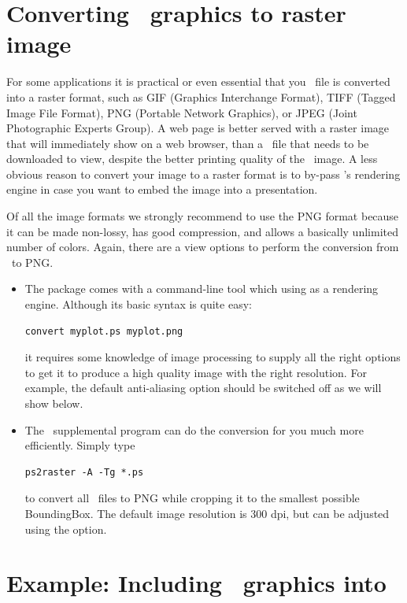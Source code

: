 \section{Converting \gmt\ graphics to raster image}

For some applications it is practical or even essential that you \PS\ file is converted into a raster format, such as GIF (Graphics Interchange Format), TIFF (Tagged Image File Format), PNG (Portable Network Graphics), or JPEG (Joint Photographic Experts Group). A web page is better served with a raster image that will immediately show on a web browser, than a \PS\ file that needs to be downloaded to view, despite the better printing quality of the \PS\ image. A less obvious reason to convert your image to a raster format is to by-pass 's rendering engine in case you want to embed the image into a presentation.

Of all the image formats we strongly recommend to use the PNG format because it can be made non-lossy, has good compression, and allows a basically unlimited number of colors. Again, there are a view options to perform the conversion from \PS\ to PNG.
\begin{itemize}
\item The  package comes with a command-line tool  which using  as a rendering engine. Although its basic syntax is quite easy:
\small
\begin{verbatim}
convert myplot.ps myplot.png
\end{verbatim}
\normalsize
it requires some knowledge of image processing to supply all the right options to get it to produce a high quality image with the right resolution. For example, the default anti-aliasing option should be switched off as we will show below. 

\item The \GMT\ supplemental program  can do the conversion for you much more efficiently. Simply type
\small
\begin{verbatim}
ps2raster -A -Tg *.ps
\end{verbatim}
\normalsize
to convert all \PS\ files to PNG while cropping it to the smallest possible BoundingBox. The default image resolution is 300 dpi, but can be adjusted using the  option.
\end{itemize}

\section{Example: Including \gmt\ graphics into }

